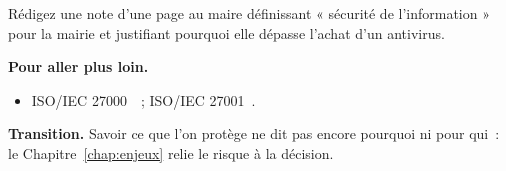 \begin{boxexo}[title={\ding{45}\quad Exercice~1.10. Note de cadrage \niveauexpert}]
Rédigez une note d'une page au maire définissant « sécurité de l'information »
pour la mairie et justifiant pourquoi elle dépasse l'achat d'un antivirus.
\end{boxexo}

\bigskip

\begin{boxinfo}
\textbf{Pour aller plus loin.}
\begin{itemize}
    \item ISO/IEC 27000~\cite{iso27000}~; ISO/IEC 27001~\cite{iso27001}.
\end{itemize}
\end{boxinfo}

\begin{boxinfo}
\textbf{Transition.} Savoir ce que l'on protège ne dit pas encore pourquoi ni
pour qui~: le Chapitre~\ref{chap:enjeux} relie le risque à la décision.
\end{boxinfo}
